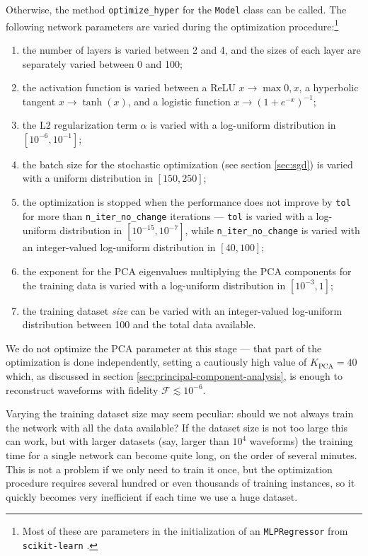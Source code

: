 \documentclass[main.tex]{subfiles}
\begin{document}
Otherwise, the method \texttt{optimize\_hyper} for the \texttt{Model} class can be called. 
The following network parameters are varied during the optimization procedure:\footnote{Most of these are parameters in the initialization of an \texttt{MLPRegressor} from \texttt{scikit-learn} \cite{pedregosaScikitlearnMachineLearning2011}.}
\begin{enumerate}
    \item the number of layers is varied between 2 and 4, and the sizes of each layer are separately varied between 0 and 100;
    \item the activation function is varied between a \ac{ReLU} \(x \to \max{0, x}\), a hyperbolic tangent \(x 
\to \tanh(x)\), and a logistic function \(x \to (1 + e^{-x})^{-1}\);
    \item the L2 regularization term \(\alpha \) is varied with a log-uniform distribution in \([10^{-6}, 10^{-1}]\);
    \item the batch size for the stochastic optimization (see section \ref{sec:sgd}) is varied with a uniform distribution in \([150, 250]\);
    \item the optimization is stopped when the performance does not improve by \texttt{tol} for more than \texttt{n\_iter\_no\_change} iterations --- \texttt{tol} is varied with a log-uniform distribution in \([10^{-15}, 10^{-7}]\), while \texttt{n\_iter\_no\_change} is varied with an integer-valued log-uniform distribution in \([40, 100]\);
    \item the exponent for the \ac{PCA} eigenvalues multiplying the \ac{PCA} components for the training data is varied with a log-uniform distribution in \([10^{-3}, 1]\);
    \item the training dataset \emph{size} can be varied with an integer-valued log-uniform distribution between 100 and the total data available.
\end{enumerate}

We do not optimize the \ac{PCA} parameter at this stage --- that part of the optimization is done independently, setting a cautiously high value of \(K_{\text{PCA}} = 40\) which, as discussed in section \ref{sec:principal-component-analysis}, is  enough to reconstruct waveforms with fidelity \(\mathcal{F} \lesssim 10^{-6}\). 

Varying the training dataset size may seem peculiar: should we not always train the network with all the data available? 
If the dataset size is not too large this can work, but with larger datasets (say, larger than \(10^4\) waveforms) the training time for a single network can become quite long, on the order of several minutes. 
This is not a problem if we only need to train it once, but the optimization procedure requires several hundred or even thousands of training instances, so it quickly becomes very inefficient if each time we use a huge dataset. 
\end{document}
